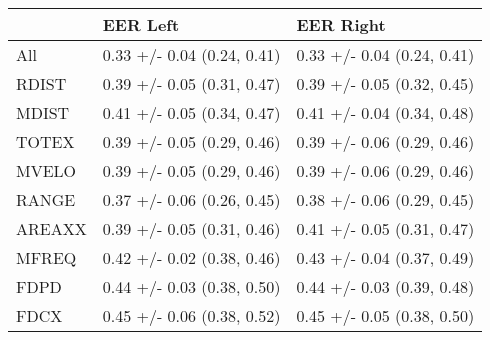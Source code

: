 \begin{tabular}{lll}
\toprule
{} &                    EER Left &                   EER Right \\
\midrule
All    &  0.33 +/- 0.04 (0.24, 0.41) &  0.33 +/- 0.04 (0.24, 0.41) \\
RDIST  &  0.39 +/- 0.05 (0.31, 0.47) &  0.39 +/- 0.05 (0.32, 0.45) \\
MDIST  &  0.41 +/- 0.05 (0.34, 0.47) &  0.41 +/- 0.04 (0.34, 0.48) \\
TOTEX  &  0.39 +/- 0.05 (0.29, 0.46) &  0.39 +/- 0.06 (0.29, 0.46) \\
MVELO  &  0.39 +/- 0.05 (0.29, 0.46) &  0.39 +/- 0.06 (0.29, 0.46) \\
RANGE  &  0.37 +/- 0.06 (0.26, 0.45) &  0.38 +/- 0.06 (0.29, 0.45) \\
AREAXX &  0.39 +/- 0.05 (0.31, 0.46) &  0.41 +/- 0.05 (0.31, 0.47) \\
MFREQ  &  0.42 +/- 0.02 (0.38, 0.46) &  0.43 +/- 0.04 (0.37, 0.49) \\
FDPD   &  0.44 +/- 0.03 (0.38, 0.50) &  0.44 +/- 0.03 (0.39, 0.48) \\
FDCX   &  0.45 +/- 0.06 (0.38, 0.52) &  0.45 +/- 0.05 (0.38, 0.50) \\
\bottomrule
\end{tabular}
